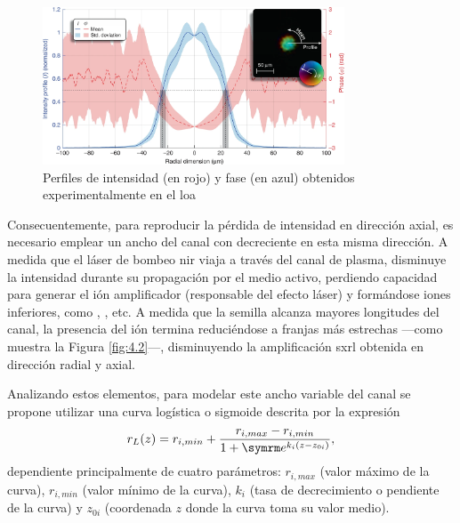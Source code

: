\begin{figure}[htbp]
  \centering
  \includegraphics[width=0.8\textwidth]{Figuras/ch2_curvas_lab.png}
  \caption{Perfiles de intensidad (en rojo) y fase (en azul)\autocite{Tuitje2020} obtenidos experimentalmente en el \acrshort{loa}}
  \label{fig:4.1}
\end{figure}

Consecuentemente, para reproducir la pérdida de intensidad en dirección axial, es necesario emplear un ancho del canal con  decreciente en esta misma dirección. A medida que el láser de bombeo \acrshort{nir} viaja a través del canal de plasma, disminuye la intensidad durante su propagación por el medio activo, perdiendo capacidad para generar el ión amplificador  (responsable del efecto láser) y formándose iones inferiores, como , , etc. A medida que la semilla alcanza mayores longitudes del canal, la presencia del ión termina reduciéndose a franjas más estrechas ---como muestra la Figura \ref{fig:4.2}---, disminuyendo la amplificación \acrshort{sxrl} obtenida en dirección radial y axial.

Analizando estos elementos, para modelar este ancho variable del canal se propone utilizar una curva logística o sigmoide descrita por la expresión 
\begin{equation}\label{eq:4.0}
  r_{L}(z) = r_{i,min} + \frac{r_{i,max}-r_{i,min}}{1+\eu^{k_{i}(z-z_{0i})}},
\end{equation}
dependiente principalmente de cuatro parámetros: $r_{i,max}$ (valor máximo de la curva), $r_{i,min}$ (valor mínimo de la curva), $k_{i}$ (tasa de decrecimiento o pendiente de la curva) y $z_{0i}$ (coordenada $z$ donde la curva toma su valor medio).

